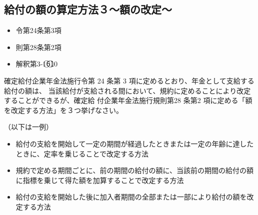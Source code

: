 \newpage

\subsection{給付の額の算定方法３〜額の改定〜}

\begin{InyouJobunbox}
  \begin{itemize}
    \item 令第24条第3項
    \item 則第28条第2項
    \item 解釈第3-1\textcircled{6}\textcircled{10}
  \end{itemize}
\end{InyouJobunbox}

\begin{shortanswer}[年金1 2020 問題2(1)\textcircled{2}]
   確定給付企業年金法施行令第 24 条第 3 項に定めるとおり、年金として支給する給付の額は、
当該給付が支給される間において、規約に定めることにより改定することができるが、確定給
付企業年金法施行規則第28 条第2 項に定める「額を改定する方法」を３つ挙げなさい。
\end{shortanswer}

\begin{answerbox}
  （以下は一例）
  \begin{itemize}
    \item 給付の支給を開始して一定の期間が経過したときまたは一定の年齢に達したときに、定率を乗じることで改定する方法
\item 規約で定める期間ごとに、前の期間の給付の額に、当該前の期間の給付の額に指標を乗じて得た額を加算することで改定する方法
\item 給付の支給を開始した後に加入者期間の全部または一部により給付の額を改定する方法
  \end{itemize}
\end{answerbox}

